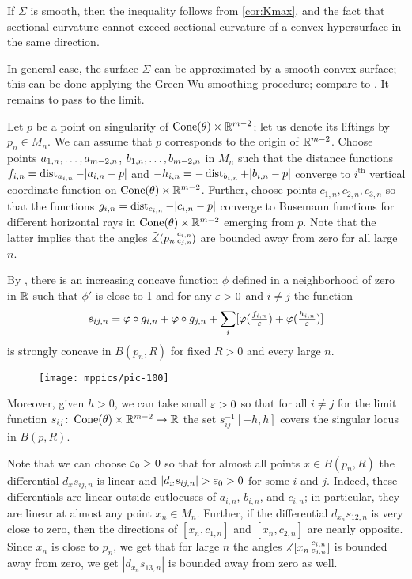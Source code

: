  If $\Sigma$ is smooth, then the inequality follows from \ref{cor:Kmax}, and the fact that sectional curvature  cannot exceed sectional curvature of a convex hypersurface in the same direction.

In general case, the surface $\Sigma$ can be approximated by a smooth convex surface;
this can be done applying the Green-Wu smoothing procedure; compare to \cite{AKP-buyalo}.
It remains to pass to the limit.
\qeds

Let $p$ be a point on singularity of $\operatorname{Cone}(\theta)\times \mathbb{R}^{m-2}$;
let us denote its liftings by $p_n\in M_n$.
We can assume that $p$ corresponds to the origin of $\mathbb{R}^{m-2}$.
Choose points $a_{1,n},\zz\dots,a_{m-2,n}$, $b_{1,n},\zz\dots,b_{m-2,n}$ in $M_n$ such that the distance functions $f_{i,n}=\operatorname{\rm dist}_{a_{i,n}}-|a_{i,n}-p|$ and $-h_{i,n}=-\operatorname{\rm dist}_{b_{i,n}}+|b_{i,n}-p|$ converge to $i^{\text{th}}$ vertical coordinate function on $\operatorname{Cone}(\theta)\times \mathbb{R}^{m-2}$.
Further, choose points $c_{1,n},c_{2,n},c_{3,n}$ so that the functions $g_{i,n}=\operatorname{\rm dist}_{c_{i,n}}-|c_{i,n}-p|$ converge to Busemann functions for different horizontal rays in $\operatorname{Cone}(\theta)\times \mathbb{R}^{m-2}$ emerging from $p$.
Note that the latter implies that the angles $\tilde\measuredangle(p_n\,{}^{c_{i,n}}_{c_{j,n}}\hspace{-0.2ex})$ are bounded away from zero for all large $n$.

By \cite[Lemma 7.2.1]{petrunin-conc}, there is an increasing concave function $\phi$ defined in a neighborhood of zero in $\mathbb{R}$ such that $\phi'$ is close to 1 and for any $\varepsilon>0$ and $i\ne j$ the function 
\[s_{ij,n}=\varphi\circ g_{i,n} + \varphi\circ g_{j,n}+\sum_i[\varphi(\tfrac{f_{i,n}}{\varepsilon})+\varphi(\tfrac{h_{i,n}}{\varepsilon})]\]
is strongly concave in $B(p_n,R)$ for fixed $R>0$ and every large $n$.

\begin{wrapfigure}{r}{40 mm}
\vskip-0mm
\centering
\texttt{[image: mppics/pic-100]}
\vskip0mm
\end{wrapfigure}


Moreover, given $h>0$, we can take small $\varepsilon>0$ so that for all $i\ne j$ for the limit function $s_{ij}\colon\operatorname{Cone}(\theta)\times \mathbb{R}^{m-2}\to \mathbb{R}$ the set $s_{ij}^{-1}[-h,h]$ covers the singular locus in $B(p,R)$. 

Note that we can choose $\varepsilon_0>0$ so that for almost all points $x\in B(p_n,R)$ 
the differential $d_xs_{ij,n}$ is linear and $|d_xs_{ij,n}|>\eps_0>0$ for some $i$ and $j$.
Indeed, these differentials are linear outside cutlocuses of $a_{i,n}$, $b_{i,n}$, and $c_{i,n}$;
in particular, they are linear at almost any point $x_n\in M_n$.
Further, if the differential $d_{x_n}s_{12,n}$ is very close to zero,
then the directions of $[x_n,c_{1,n}]$ and $[x_n,c_{2,n}]$ are nearly opposite.
Since $x_n$ is close to $p_n$, we get that for large $n$ the angles $\measuredangle[x_n\,{}^{c_{i,n}}_{c_{j,n}}]$ is bounded away from zero, we get $|d_{x_n}s_{13,n}|$ is bounded away from zero as well.

